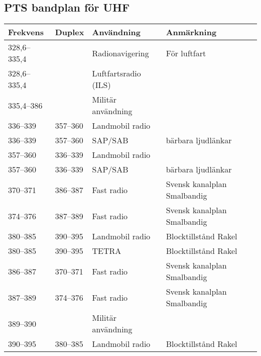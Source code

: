 \begin{landscape}
\subsection{PTS bandplan för UHF}
\begin{longtable}{llll}
	\textbf{Frekvens}  & \textbf{Duplex}    & \textbf{Användning}     & \textbf{Anmärkning}                   \\ \hline
	\endhead
	328,6--335,4       &                    & Radionavigering         & För luftfart                          \\
	328,6--335,4       &                    & Luftfartsradio (ILS)    &                                       \\
	335,4--386         &                    & Militär användning      &                                       \\
	336--339           & 357--360           & Landmobil radio         &                                       \\
	336--339           & 357--360           & SAP/SAB                 & bärbara ljudlänkar                    \\
	357--360           & 336--339           & Landmobil radio         &                                       \\
	357--360           & 336--339           & SAP/SAB                 & bärbara ljudlänkar                    \\
	370--371           & 386--387           & Fast radio              & Svensk kanalplan Smalbandig           \\
	374--376           & 387--389           & Fast radio              & Svensk kanalplan Smalbandig           \\
	380--385           & 390--395           & Landmobil radio         & Blocktillstånd Rakel                  \\
	380--385           & 390--395           & TETRA                   & Blocktillstånd Rakel                  \\
	386--387           & 370--371           & Fast radio              & Svensk kanalplan Smalbandig           \\
	387--389           & 374--376           & Fast radio              & Svensk kanalplan Smalbandig           \\
	389--390           &                    & Militär användning      &                                       \\
	390--395           & 380--385           & Landmobil radio         & Blocktillstånd Rakel                  \\

\end{longtable}
\end{landscape}
